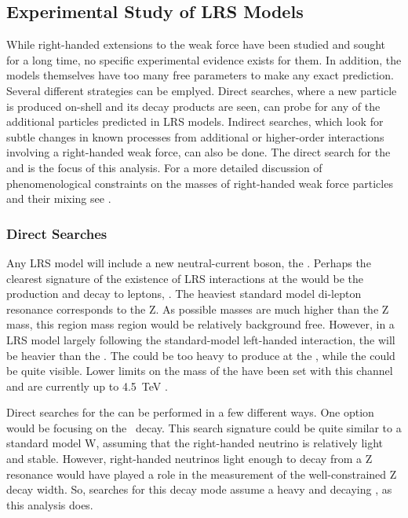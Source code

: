 \subsection{Experimental Study of LRS Models}

While right-handed extensions to the weak force have been studied and sought for a long time, no specific experimental evidence exists for them.  In addition, the models themselves have too many free parameters to make any exact prediction.  Several different strategies can be emplyed.  Direct searches, where a new particle is produced on-shell and its decay products are seen, can probe for any of the additional particles predicted in LRS models.  Indirect searches, which look for subtle changes in known processes from additional or higher-order interactions involving a right-handed weak force, can also be done. The direct search for the \WR and \NR is the focus of this analysis. 
For a more detailed discussion of phenomenological constraints on the masses of right-handed weak force particles and their mixing see \cite{WRphenomLimits}.


\subsubsection{Direct Searches}
Any LRS model will include a new neutral-current boson, the \Zprime.  Perhaps the clearest signature of the existence of LRS interactions at the \LHC would be the \Zprime production and decay to leptons, \ZPtoLL. The heaviest standard model di-lepton resonance corresponds to the Z. As possible \Zprime masses are much higher than the Z mass, this region mass region would be relatively background free.  However, in a LRS model largely following the standard-model left-handed interaction, the \Zprime will be heavier than the \WR.  The \Zprime could be too heavy to produce at the \LHC, while the \WR could be quite visible.  Lower limits on the mass of the \Zprime have been set with this channel and are currently up to \SI{4.5}{\TeV} \cite{Zprime13TeVCMS}.

Direct searches for the \WR can be performed in a few different ways. One option would be focusing on the \WRtoLN\ decay. This search signature could be quite similar to a standard model W, assuming that the right-handed neutrino is relatively light and stable. However, right-handed neutrinos light enough to decay from a Z resonance would have played a role in the measurement of the well-constrained Z decay width. So, searches for this decay mode assume a heavy and decaying \NR, as this analysis does. 

